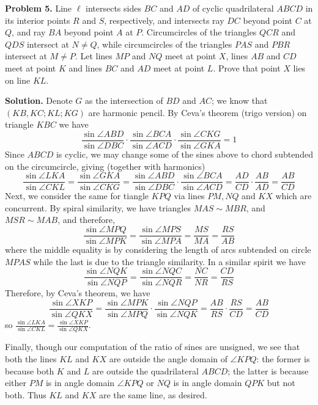 \documentclass[11pt,a4paper]{article}
\begin{document}
	\textbf{Problem 5.}
	Line $\ell$ intersects sides $BC$ and $AD$ of cyclic quadrilateral $ABCD$ in its interior points $R$ and $S$, respectively, and intersects ray $DC$ beyond point $C$ at $Q$, and ray $BA$ beyond point $A$ at $P$. Circumcircles of the triangles $QCR$ and $QDS$ intersect at $N \neq Q$, while circumcircles of the triangles $PAS$ and $PBR$ intersect at $M\neq P$. Let lines $MP$ and $NQ$ meet at point $X$, lines $AB$ and $CD$ meet at point $K$ and lines $BC$ and $AD$ meet at point $L$. Prove that point $X$ lies on line $KL$.
	
	\textbf{Solution.} 
	Denote $G$ as the intersection of $BD$ and $AC$; we know that $(KB, KC; KL; KG)$ are harmonic pencil.
	By Ceva's theorem (trigo version) on triangle $KBC$ we have
	\[
	\frac{\sin\angle ABD}{\sin\angle DBC}\cdot \frac{\sin\angle BCA}{\sin\angle ACD}\cdot \frac{\sin\angle CKG}{\sin\angle GKA} = 1
	\]
	Since $ABCD$ is cyclic, we may change some of the sines above to chord subtended on the circumcircle, giving (together with harmonics)
	\[
	\frac{\sin\angle LKA}{\sin\angle CKL} 
	= \frac{\sin\angle GKA}{\sin\angle CKG} 
	= \frac{\sin\angle ABD}{\sin\angle DBC}\cdot \frac{\sin\angle BCA}{\sin\angle ACD}
	=\frac{AD}{CD}\cdot \frac{AB}{AD}
	=\frac{AB}{CD}
	\]
	Next, we consider the same for tiangle $KPQ$ via lines $PM, NQ$ and $KX$ which are concurrent. By spiral similarity, we have triangles $MAS\sim MBR$, and $MSR\sim MAB$, and therefore,
	\[
	\frac{\sin\angle MPQ}{\sin\angle MPK} = 
	\frac{\sin\angle MPS}{\sin\angle MPA}
	=\frac{MS}{MA}
	=\frac{RS}{AB}
	\]where the middle equality is by considering the length of arcs subtended on circle $MPAS$ while the last is due to the triangle similarity.
	In a similar spirit we have
	\[
	\frac{\sin\angle NQK}{\sin\angle NQP} = 
	\frac{\sin\angle NQC}{\sin\angle NQR}
	=\frac{NC}{NR}
	=\frac{CD}{RS}
	\]Therefore, by Ceva's theorem, we have
	\[
	\frac{\sin\angle XKP}{\sin\angle QKX}
	= \frac{\sin\angle MPK}{\sin\angle MPQ}\cdot \frac{\sin\angle NQP}{\sin\angle NQK}
	=\frac{AB}{RS}\cdot \frac{RS}{CD}
	=\frac{AB}{CD}
	\]so $\frac{\sin\angle LKA}{\sin\angle CKL} = \frac{\sin\angle XKP}{\sin\angle QKX}$.
	
	Finally, though our computation of the ratio of sines are unsigned, we see that both the lines $KL$ and $KX$ are outside the angle domain of $\angle KPQ$: the former is because both $K$ and $L$ are outside the quadrilateral $ABCD$; the latter is because either $PM$ is in angle domain $\angle KPQ$ or $NQ$ is in angle domain $QPK$ but not both. Thus $KL$ and $KX$ are the same line, as desired.
	
\end{document}
